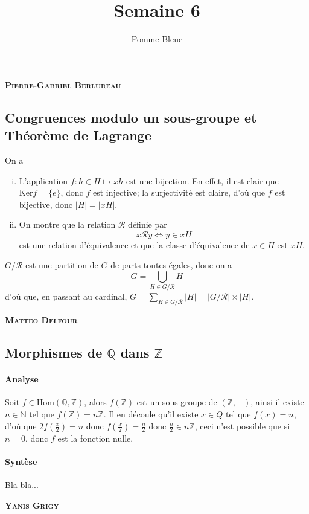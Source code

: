 \documentclass[17pt]{article}
\title{Semaine 6}
\author{Pomme Bleue}
\def\N{\mathbb N}
\def\Z{\mathbb Z}
\def\Q{\mathbb Q}
\def\Ker{\text{Ker}}
\def\ssi{\Leftrightarrow}
\begin{document}
	\maketitle
	\begin{center}
		\bfseries\Large\textsc{Pierre-Gabriel Berlureau}
	\end{center}
	\subsection*{Congruences modulo un sous-groupe et Théorème de Lagrange}
	On a 
	\begin{enumerate}[i)]
		\item L'application $f:h\in H\mapsto xh$ est une bijection. En effet, il est clair que $\Ker f = \lbrace e\rbrace$, donc $f$ est injective; la surjectivité est claire, d'où que $f$ est bijective, donc $|H|=|xH|$.
		\item On montre que la relation $\mathcal R$ définie par \[x\mathcal R y\ssi y\in xH\]
		est une relation d'équivalence et que la classe d'équivalence de $x\in H$ est $xH$.
	\end{enumerate}
	$G/\mathcal R$ est une partition de $G$ de parts toutes égales, donc on a \[G=\bigcup_{H\in G/\mathcal R}H\]
	d'où que, en passant au cardinal, $G=\sum_{H\in G/\mathcal R}|H|=|G/\mathcal R|\times|H|$.
	
	\begin{center}
		\bfseries\Large\textsc{Matteo Delfour}
	\end{center}
	\subsection*{Morphismes de $\Q$ dans $\Z$}
		\paragraph{Analyse} Soit $f\in\text{Hom}(\Q,\Z)$, alors $f(\Z)$ est un sous-groupe de $(\Z, +)$, ainsi il existe $n\in\N$ tel que $f(\Z)=n\Z$. Il en découle qu'il existe $x\in Q$ tel que $f(x)=n$, d'où que $2f(\frac x2)=n$ donc $f(\frac x2)=\frac n2$ donc $\frac n2\in n\Z$, ceci n'est possible que si $n=0$, donc $f$ est la fonction nulle.
		\paragraph{Syntèse} Bla bla...
	\begin{center}
		\bfseries\Large\textsc{Yanis Grigy}
	\end{center}
\end{document}
